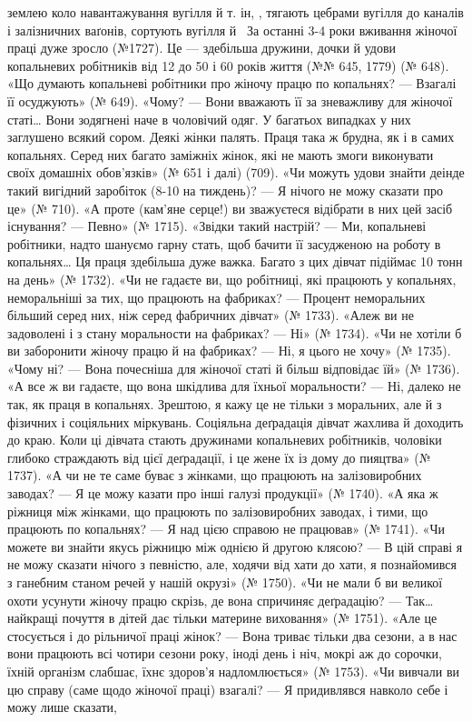 \parcont{}  %
землею коло навантажування вугілля й т. ін, , тягають цебрами
вугілля до каналів і залізничних ваґонів, сортують вугілля й~ За останні 3-4 роки вживання жіночої праці дуже зросло
(№1727). Це — здебільша дружини, дочки й удови копальневих
робітників від 12 до 50 і 60 років життя (№№ 645, 1779) (№ 648).
«Що думають копальневі робітники про жіночу працю по копальнях?
— Взагалі її осуджують» (№ 649). «Чому? — Вони вважають
її за зневажливу для жіночої статі\dots{} Вони зодягнені наче в чоловічий
одяг. У багатьох випадках у них заглушено всякий сором.
Деякі жінки палять. Праця така ж брудна, як і в самих копальнях.
Серед них багато заміжніх жінок, які не мають змоги виконувати
своїх домашніх обов’язків» (№ 651 і далі) (709). «Чи
можуть удови знайти деінде такий вигідний заробіток (8-10 на тиждень)? — Я нічого не можу сказати про це»
(№ 710). «А проте (кам’яне серце!) ви зважуєтеся відібрати в
них цей засіб існування? — Певно» (№ 1715). «Звідки такий
настрій? — Ми, копальневі робітники, надто шануємо гарну
стать, щоб бачити її засудженою на роботу в копальнях\dots{} Ця
праця здебільша дуже важка. Багато з цих дівчат підіймає
10 тонн на день» (№ 1732). «Чи не гадаєте ви, що робітниці, які
працюють у копальнях, неморальніші за тих, що працюють на
фабриках? — Процент неморальних більший серед них, ніж серед
фабричних дівчат» (№ 1733). «Алеж ви не задоволені і з стану
моральности на фабриках? — Ні» (№ 1734). «Чи не хотіли б ви
заборонити жіночу працю й на фабриках? — Ні, я цього не хочу»
(№ 1735). «Чому ні? — Вона почесніша для жіночої статі й більш
відповідає їй» (№ 1736). «А все ж ви гадаєте, що вона шкідлива
для їхньої моральности? — Ні, далеко не так, як праця в копальнях.
Зрештою, я кажу це не тільки з моральних, але й з фізичних
і соціяльних міркувань. Соціяльна деґрадація дівчат жахлива
й доходить до краю. Коли ці дівчата стають дружинами копальневих
робітників, чоловіки глибоко страждають від цієї деґрадації,
і це жене їх із дому до пияцтва» (№ 1737). «А чи не те саме буває
з жінками, що працюють на залізовиробних заводах? — Я це
можу казати про інші галузі продукції» (№ 1740). «А яка ж ріжниця
між жінками, що працюють по залізовиробних заводах,
і тими, що працюють по копальнях? — Я над цією справою не
працював» (№ 1741). «Чи можете ви знайти якусь ріжницю
між однією й другою клясою? — В цій справі я не можу сказати
нічого з певністю, але, ходячи від хати до хати, я познайомився
з ганебним станом речей у нашій окрузі» (№ 1750). «Чи не мали б
ви великої охоти усунути жіночу працю скрізь, де вона спричиняє
деґрадацію? — Так\dots{} найкращі почуття в дітей дає тільки материне
виховання» (№ 1751). «Але це стосується і до рільничої
праці жінок? — Вона триває тільки два сезони, а в нас вони працюють
всі чотири сезони року, іноді день і ніч, мокрі аж до
сорочки, їхній організм слабшає, їхнє здоров’я надломлюється»
(№ 1753). «Чи вивчали ви цю справу (саме щодо жіночої праці)
взагалі? — Я придивлявся навколо себе і можу лише сказати,
\parbreak{}  %
